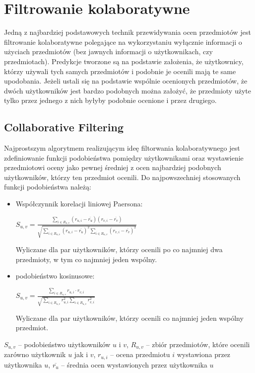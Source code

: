 \documentclass{pracamgr}
\begin{document}
  \section{Filtrowanie kolaboratywne}
   Jedną z najbardziej podstawowych technik przewidywania ocen przedmiotów jest filtrowanie kolaboratywne polegające na wykorzystaniu wyłącznie informacji
   o użyciach przedmiotów (bez jawnych informacji o użytkownikach, czy przedmiotach). Predykcje tworzone są na podstawie założenia, że użytkownicy,
   którzy używali tych samych przedmiotów i podobnie je ocenili mają te same upodobania. Jeżeli ustali się na podstawie wspólnie ocenionych przedmiotów,
   że dwóch użytkowników jest bardzo podobnych można założyć,
   że przedmioty użyte tylko przez jednego z nich byłyby podobnie ocenione i przez drugiego.
   \subsection{Collaborative Filtering}
    Najprostszym algorytmem realizującym ideę filtorwania kolaboratywnego jest zdefiniowanie funkcji podobieństwa pomiędzy użytkownikami
    oraz wystawienie przedmiotowi oceny jako pewnej średniej z ocen najbardziej podobnych użytkowników, którzy ten przedmiot ocenili.\newline
    Do najpowszechniej stosowanych funkcji podobieństwa należą:
    \begin{itemize}\itemsep1pt \parskip0pt 
     \item Współczynnik korelacji liniowej Paersona:
      \begin{center}
       $S_{u,v}=\frac{\sum\limits_{i\in R_{u,v}}(r_{u,i}-\overline{r_u})(r_{v,i}-\overline{r_v})}
       {\sqrt{\sum\limits_{i\in R_{u,v}}(r_{u,i}-\overline{r_u})^2\sum\limits_{i\in R_{u,v}}(r_{v,i}-\overline{r_v})^2}}$
      \end{center}
      Wyliczane dla par użytkowników, którzy ocenili po co najmniej dwa przedmioty, w tym co najmniej jeden wspólny.
     \item podobieństwo kosinusowe:
      \begin{center}
       $S_{u,v}=\frac{\sum\limits_{i\in R_{u,v}}r_{u,i}\cdot r_{v,i}}
       {\sqrt{\sum\limits_{i\in R_{u,v}}r_{u,i}^2\sum\limits_{i\in R_{u,v}}r_{v,i}^2}}$
      \end{center}
      Wyliczane dla par użytkowników, którzy ocenili co najmniej jeden wspólny przedmiot.
    \end{itemize}
    {\scriptsize
     $S_{u,v}$ -- podobieństwo użytkowników $u$ i $v$, $R_{u,v}$ -- zbiór przedmiotów, które ocenili zarówno użytkownik $u$ jak i $v$,\newline
     $r_{u,i}$ -- ocena przedmiotu $i$ wystawiona przez użytkownika $u$, $\overline{r_{u}}$ -- średnia ocen wystawionych przez użytkownika $u$
    }\newline
\end{document}
